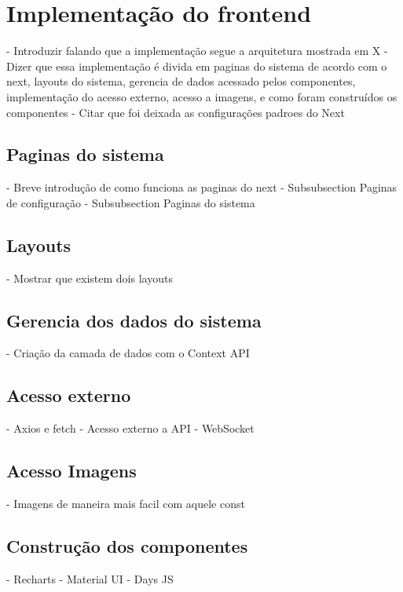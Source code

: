 \section[Implementação do frontend]{Implementação do frontend}
- Introduzir falando que a implementação segue a arquitetura mostrada em X
- Dizer que essa implementação é divida em paginas do sistema de acordo com o next, layouts do sistema, gerencia de dados acessado pelos componentes, implementação do acesso externo, acesso a imagens, e como foram construídos os componentes
- Citar que foi deixada as configurações padroes do Next

\subsection{Paginas do sistema}\label{subsec:}
- Breve introdução de como funciona as paginas do next
- Subsubsection Paginas de configuração
- Subsubsection Paginas do sistema

\subsection{Layouts}\label{subsec:}
- Mostrar que existem dois layouts

\subsection{Gerencia dos dados do sistema}\label{subsec:}
- Criação da camada de dados com o Context API

\subsection{Acesso externo}\label{subsec:}
- Axios e fetch
- Acesso externo a API
- WebSocket

\subsection{Acesso Imagens}\label{subsec:}
- Imagens de maneira mais facil com aquele const 

\subsection{Construção dos componentes}\label{subsec:}
- Recharts
- Material UI
- Days JS